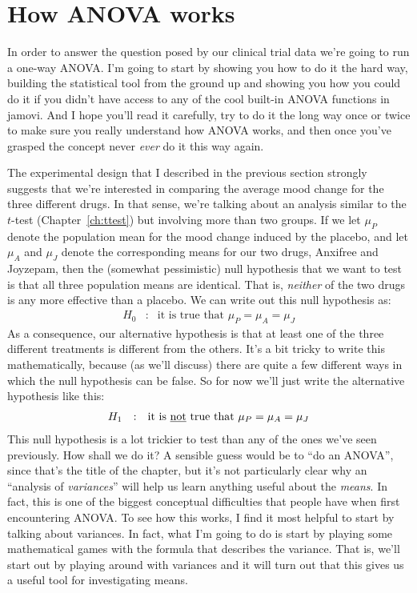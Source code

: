 \section{How ANOVA works \label{sec:anovaintro}}

In order to answer the question posed by our clinical trial data we're going to run a one-way ANOVA. I'm going to start by showing you how to do it the hard way, building the statistical tool from the ground up and showing you how you could do it if you didn't have access to any of the cool built-in ANOVA functions in jamovi. And I hope you'll read it carefully, try to do it the long way once or twice to make sure you really understand how ANOVA works, and then once you've grasped the concept never {\it ever} do it this way again.

The experimental design that I described in the previous section strongly suggests that we're interested in comparing the average mood change for the three different drugs. In that sense, we're talking about an analysis similar to the $t$-test (Chapter~\ref{ch:ttest}) but involving more than two groups. If we let $\mu_P$ denote the population mean for the mood change induced by the placebo, and let $\mu_A$ and $\mu_J$ denote the corresponding means for our two drugs, Anxifree and Joyzepam, then the (somewhat pessimistic) null hypothesis that we want to test is that all three population means are identical. That is, {\it neither} of the two drugs is any more effective than a placebo. We can write out this null hypothesis as:
$$
\begin{array}{rcl}
H_0 &:& \mbox{it is true that } \mu_P = \mu_A = \mu_J
\end{array}
$$
As a consequence, our alternative hypothesis is that at least one of the three different treatments is different from the others. It's a bit tricky to write this mathematically, because (as we'll discuss) there are quite a few different ways in which the null hypothesis can be false. So for now we'll just write the alternative hypothesis like this:
$$
\begin{array}{rcl}
H_1 &:& \mbox{it is \underline{not} true that } \mu_P = \mu_A = \mu_J
\end{array}
$$
This null hypothesis is a lot trickier to test than any of the ones we've seen previously. How shall we do it? A sensible guess would be to ``do an ANOVA'', since that's the title of the chapter, but it's not particularly clear why an ``analysis of {\it variances}'' will help us learn anything useful about the {\it means}. In fact, this is one of the biggest conceptual difficulties that people have when first encountering ANOVA. To see how this works, I find it most helpful to start by talking about variances. In fact, what I'm going to do is start by playing some mathematical games with the formula that describes the variance. That is, we'll start out by playing around with variances and it will turn out that this gives us a useful tool for investigating means.

